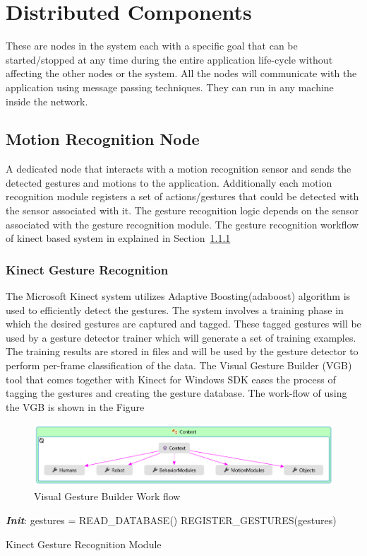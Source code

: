 \section{Distributed Components}
\label{ssec:dist_comp}
These are nodes in the system each with a specific goal that can be started/stopped at any time during the entire application life-cycle without affecting the other nodes or the system. All the nodes will communicate with the application using message passing techniques. They can run in any machine inside the network.

\subsection{Motion Recognition Node} A dedicated node that interacts with a motion recognition sensor and sends the detected gestures and motions to the application. Additionally each motion recognition module registers a set of actions/gestures that could be detected with the sensor associated with it. The gesture recognition logic depends on the sensor associated with the gesture recognition module. The gesture recognition workflow of kinect based system in explained in Section~\ref{sssec:kinect_gestures}
\subsubsection{Kinect Gesture Recognition}
\label{sssec:kinect_gestures}
	The Microsoft Kinect system utilizes Adaptive Boosting(adaboost) algorithm\cite{Freund1997119} is used to efficiently detect the gestures. The system involves a training phase in which the desired gestures are captured and tagged. These tagged gestures will be used by a gesture detector trainer which will generate a set of training examples. The training results are stored in files and will be used by the gesture detector to perform per-frame classification of the data. The Visual Gesture Builder (VGB) tool that comes together with Kinect for Windows SDK eases the process of tagging the gestures and creating the gesture database. The work-flow of using the VGB is shown in the Figure~\
\begin{figure}
\centering
\includegraphics[width=\textwidth]{assets/context_diagram.png}
\caption[Visual Gesture Builder Work flow]{Visual Gesture Builder Work flow}
\label{fig:vgb_workflow}
\end{figure}
\begin{algorithm}
 \textbf{\emph{Init}}:\;
 \quad gestures = READ\_DATABASE() \;
 \quad REGISTER\_GESTURES(gestures) \;
 \caption{Kinect Gesture Recognition Module}
 \label{alg:localize}
\end{algorithm}

